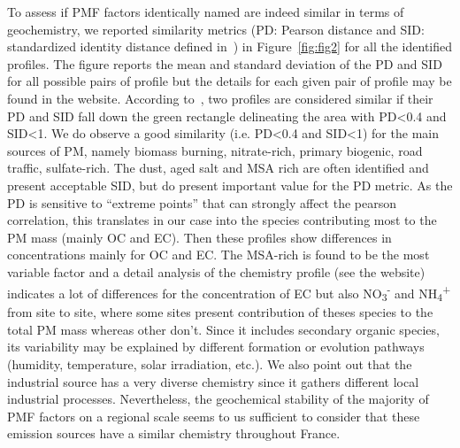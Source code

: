 \documentclass[acp]{copernicus}
\begin{document}
To assess if PMF factors identically named are indeed similar in terms
of geochemistry, we reported similarity metrics (PD: Pearson distance
and SID: standardized identity distance defined in~\citep{pernigottiDeltaSA2018}) in
Figure~\ref{fig:fig2} for
all the identified profiles. The figure reports the mean and standard
deviation of the PD and SID for all possible pairs of profile but the
details for each given pair of profile may be found in the website.
According to~\citet{pernigottiDeltaSA2018}, two profiles are considered
similar if their PD and SID fall down the green rectangle delineating
the area with PD\textless0.4 and SID\textless1. We do observe a good
similarity (i.e. PD\textless0.4 and SID\textless1) for the main sources
of PM, namely biomass burning, nitrate-rich, primary biogenic, road
traffic, sulfate-rich. The dust, aged salt and MSA rich are often
identified and present acceptable SID, but do present important value
for the PD metric. As the PD is sensitive to ``extreme points'' that can
strongly affect the pearson correlation, this translates in our case
into the species contributing most to the PM mass (mainly OC and EC).
Then these profiles show differences in concentrations mainly for OC and
EC. The MSA-rich is found to be the most variable factor and a detail
analysis of the chemistry profile (see the website) indicates a lot of
differences for the concentration of EC but also
NO\textsubscript{3}\textsuperscript{-} and
NH\textsubscript{4}\textsuperscript{+} from site to site, where some
sites present contribution of theses species to the total PM mass
whereas other don't. Since it includes secondary organic species, its
variability may be explained by different formation or evolution
pathways (humidity, temperature, solar irradiation, etc.). We also point
out that the industrial source has a very diverse chemistry since it
gathers different local industrial processes. Nevertheless, the
geochemical stability of the majority of PMF factors on a regional scale
seems to us sufficient to consider that these emission sources have a
similar chemistry throughout France.
\end{document}
